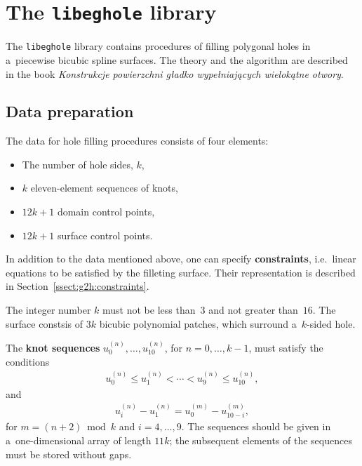 

\chapter{The \texttt{libeghole} library}

The \texttt{libeghole} library contains procedures of filling polygonal
holes in a~piecewise bicubic spline surfaces. The theory and
the algorithm are described in the book \emph{Konstrukcje powierzchni
g{\l}adko wype{\l}niaj{\k a}cych wielok{\k a}tne otwory}.


\section{\label{sect:G2:data}Data preparation}

The data for hole filling procedures consists of four elements:
\begin{itemize}
  \item The number of hole sides, $k$,
  \item $k$ eleven-element sequences of knots,
  \item $12k+1$ domain control points,
  \item $12k+1$ surface control points.
\end{itemize}
In addition to the data mentioned above, one can specify \textbf{constraints},
i.e.\ linear equations to be satisfied by the filleting surface. Their
representation is described in Section~\ref{ssect:g2h:constraints}.

The integer number $k$ must not be less than~$3$ and not greater than~$16$.
The surface constsis of $3k$ bicubic polynomial patches, which surround
a~$k$-sided hole.

The \textbf{knot sequences} $u^{(n)}_0,\ldots,u^{(n)}_{10}$, for $n=0,\ldots,k-1$,
must satisfy the conditions
\begin{align*}
  u^{(n)}_0\leq u^{(n)}_1<\cdots<u^{(n)}_9\leq u^{(n)}_{10},
\end{align*}
and
\begin{align*}
  u^{(n)}_i-u^{(n)}_1 = u^{(m)}_0-u^{(m)}_{10-i},
\end{align*}
for $m=(n+2)\bmod k$ and $i=4,\ldots,9$.
The sequences should be given in a~one-dimensional array of length $11k$;
the subsequent elements of the sequences must be stored without gaps.


